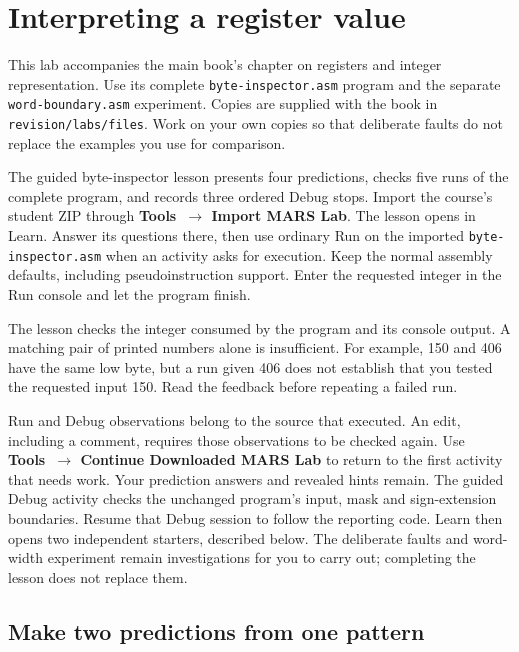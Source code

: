 \chapter{Interpreting a register value}
\label{revision:lab-integer-representation}

This lab accompanies the main book's chapter on registers and integer
representation. Use its complete \texttt{byte-inspector.asm} program and the
separate \texttt{word-boundary.asm} experiment. Copies are supplied with the book
in \texttt{revision/labs/files}. Work on your own copies so that deliberate
faults do not replace the examples you use for comparison.

The guided byte-inspector lesson presents four predictions, checks five runs
of the complete program, and records three ordered Debug stops. Import the
course's student ZIP through
\textbf{Tools~\(\to\) Import MARS Lab}. The lesson opens in Learn. Answer its
questions there, then use ordinary Run on the imported
\texttt{byte-inspector.asm} when an activity asks for execution. Keep the normal
assembly defaults, including pseudoinstruction support. Enter the requested
integer in the Run console and let the program finish.

The lesson checks the integer consumed by the program and its console output.
A matching pair of printed numbers alone is insufficient. For example, 150 and
406 have the same low byte, but a run given 406 does not establish that you tested
the requested input 150. Read the feedback before repeating a failed run.

Run and Debug observations belong to the source that executed. An edit,
including a comment, requires those observations to be checked again. Use
\textbf{Tools~\(\to\) Continue Downloaded MARS Lab} to return to the first
activity that needs work. Your prediction answers and revealed hints remain.
The guided Debug activity checks the unchanged program's input, mask and
sign-extension boundaries. Resume that Debug session to follow the reporting
code. Learn then opens two independent starters, described below. The deliberate
faults and word-width experiment remain investigations for you to carry out;
completing the lesson does not replace them.

\section{Make two predictions from one pattern}

